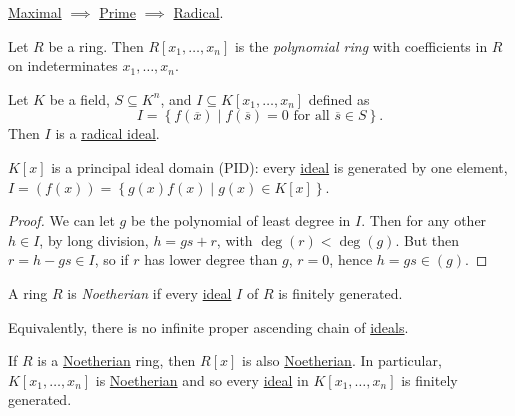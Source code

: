 \begin{remark}
	\hyperref[def:proper-ideal-maximal]{Maximal} \(\implies \) \hyperref[def:prime]{Prime} \(\implies \) \hyperref[def:radical]{Radical}.
\end{remark}

\begin{definition}\label{def:polynomial-ring}
	Let \(R\) be a ring. Then \(R[x_1, \ldots , x_n]\) is the \emph{polynomial ring} with coefficients in \(R\) on indeterminates \(x_1, \ldots , x_n\).
\end{definition}

\begin{eg}
	Let \(K\) be a field, \(S \subseteq K^n\), and \(I \subseteq K[x_1, \ldots , x_n]\) defined as
	\[
		I=\left\{ f(\overline{x} ) \mid f(\overline{s} )= 0\text{ for all }\overline{s} \in S \right\}.
	\]
	Then \(I\) is a \hyperref[def:radical]{radical ideal}.
\end{eg}

\begin{theorem}
	\(K[x]\) is a principal ideal domain (PID): every \hyperref[def:ideal]{ideal} is generated by one element, \(I=(f(x)) = \left\{ g(x) f(x) \mid g(x) \in K[x] \right\} \).
\end{theorem}
\begin{proof}
	We can let \(g\) be the polynomial of least degree in \(I\). Then for any other \(h\in I\), by long division, \(h = gs + r\), with \(\deg (r) < \deg(g)\). But then \(r = h - gs \in I\), so if \(r\) has lower degree than \(g\), \(r = 0\), hence \(h = gs\in (g)\).
\end{proof}

\begin{definition}[Noetherian]\label{def:Noetherian}
	A ring \(R\) is \emph{Noetherian} if every \hyperref[def:ideal]{ideal} \(I\) of \(R\) is finitely generated.
\end{definition}

\begin{remark}
	Equivalently, there is no infinite proper ascending chain of \hyperref[def:ideal]{ideals}.
\end{remark}

\begin{theorem}\label{thm:Hilbert-basis}
	If \(R\) is a \hyperref[def:Noetherian]{Noetherian} ring, then \(R[x]\) is also \hyperref[def:Noetherian]{Noetherian}. In particular, \(K[x_1, \ldots , x_n]\) is \hyperref[def:Noetherian]{Noetherian} and so every \hyperref[def:ideal]{ideal} in \(K[x_1, \ldots , x_n]\) is finitely generated.
\end{theorem}

